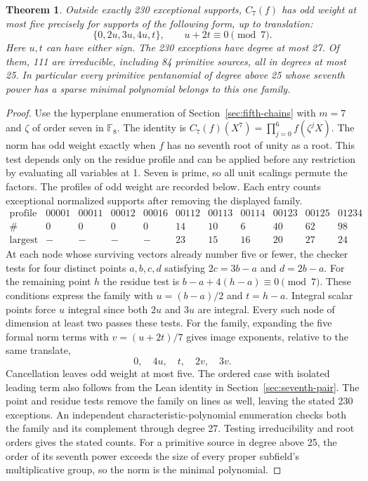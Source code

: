 \documentclass[11pt]{article}
\newtheorem{theorem}{Theorem}
\begin{document}
\begin{theorem}
Outside exactly 230 exceptional supports, \(C_7(f)\) has odd weight at
most five precisely for supports of the following form, up to translation:
\[
              \{0,2u,3u,4u,t\},\qquad u+2t\equiv0\pmod7 .
\]
Here \(u,t\) can have either sign. The 230 exceptions have degree at most
27. Of them, 111 are irreducible, including 84 primitive sources, all
in degrees at most 25. In particular every primitive pentanomial of
degree above 25 whose seventh power has a sparse minimal polynomial
belongs to this one family.
\end{theorem}
\begin{proof}
Use the hyperplane enumeration of Section~\ref{sec:fifth-chains} with
\(m=7\) and \(\zeta\) of order seven in \(\mathbb F_8\).
The identity is \(C_7(f)(X^7)=\prod_{j=0}^6 f(\zeta^jX)\).
The norm has odd weight exactly when \(f\) has no seventh root of
unity as a root. This test depends only on the residue profile and
can be applied before any restriction by evaluating all variables at 1.
Seven is prime, so all unit scalings permute the factors.
The profiles of odd weight are recorded below. Each entry counts
exceptional normalized supports after removing the displayed family.
\[
\begin{array}{c|rrrrrrrrrr}
\text{profile}&00001&00011&00012&00016&00112&00113&00114&00123&00125&01234\\\hline
\#&0&0&0&0&14&10&6&40&62&98\\
\text{largest degree}&-&-&-&-&23&15&16&20&27&24
\end{array}
\]
At each node whose surviving vectors already number five or fewer,
the checker tests for four distinct points \(a,b,c,d\) satisfying
\(2c=3b-a\) and \(d=2b-a\). For the remaining point \(h\) the
residue test is \(b-a+4(h-a)\equiv0\pmod7\). These conditions
express the family with \(u=(b-a)/2\) and \(t=h-a\). Integral scalar
points force \(u\) integral since both \(2u\) and \(3u\) are integral.
Every such node of dimension at least two passes these tests.
For the family, expanding the five formal norm terms with
\(v=(u+2t)/7\) gives image exponents, relative to the same translate,
\[
                         0,\quad 4u,\quad t,\quad 2v,\quad 3v .
\]
Cancellation leaves odd weight at most five. The ordered case with
isolated leading term also follows from the Lean identity in
Section~\ref{sec:seventh-pair}. The point and residue tests remove
the family on lines as well, leaving the stated 230 exceptions.
An independent characteristic-polynomial enumeration checks both
the family and its complement through degree 27. Testing irreducibility
and root orders gives the stated counts. For a primitive source in
degree above 25, the order of its seventh power exceeds the size of
every proper subfield's multiplicative group, so the norm is the
minimal polynomial.
\end{proof}
\end{document}
